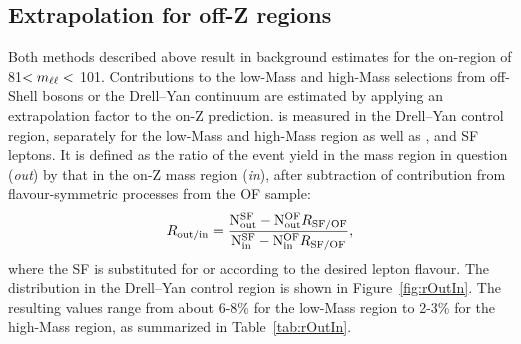 \subsection{Extrapolation for off-Z regions}
Both methods described above result in background estimates for the on-\Z region of 81\GeV $< m_{\ell\ell} < $ 101\GeV. Contributions to the low-Mass and high-Mass selections from off-Shell \Z bosons or the Drell--Yan continuum are estimated by applying an extrapolation factor \Routin to the on-Z prediction. \Routin is measured in the Drell--Yan control region, separately for the low-Mass and high-Mass region as well as \EE, \MM and SF leptons. It is defined as the ratio of the event yield in the mass region in question (\textit{out}) by that in the on-Z mass region (\textit{in}), after subtraction of contribution from flavour-symmetric processes from the OF sample:
\begin{equation}
R_\text{out/in} = \frac{\mathrm{N}_{\mathrm{out}}^{\mathrm{SF}} - \mathrm{N}_{\mathrm{out}}^{\mathrm{OF}}R_{\text{SF/OF}}}{ \mathrm{N}_{\mathrm{in}}^{\mathrm{SF}} - \mathrm{N}_{\mathrm{in}}^{\mathrm{OF}}R_{\text{SF/OF}}},
\end{equation} 
where the SF is substituted for \EE or \MM according to the desired lepton flavour. The \mll distribution in the Drell--Yan control region is shown in Figure~\ref{fig:rOutIn}. The resulting values range from about 6-8\% for the low-Mass region to 2-3\% for the high-Mass region, as summarized in Table~\ref{tab:rOutIn}.
